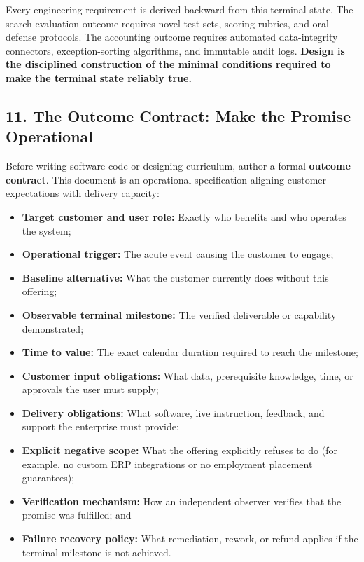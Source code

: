 Every engineering requirement is derived backward from this terminal state. The search evaluation outcome requires novel test sets, scoring rubrics, and oral defense protocols. The accounting outcome requires automated data-integrity connectors, exception-sorting algorithms, and immutable audit logs. \textbf{Design is the disciplined construction of the minimal conditions required to make the terminal state reliably true.}

\subsection*{11. The Outcome Contract: Make the Promise Operational}

Before writing software code or designing curriculum, author a formal \textbf{outcome contract}. This document is an operational specification aligning customer expectations with delivery capacity:

\begin{itemize}
    \item \textbf{Target customer and user role:} Exactly who benefits and who operates the system;
    \item \textbf{Operational trigger:} The acute event causing the customer to engage;
    \item \textbf{Baseline alternative:} What the customer currently does without this offering;
    \item \textbf{Observable terminal milestone:} The verified deliverable or capability demonstrated;
    \item \textbf{Time to value:} The exact calendar duration required to reach the milestone;
    \item \textbf{Customer input obligations:} What data, prerequisite knowledge, time, or approvals the user must supply;
    \item \textbf{Delivery obligations:} What software, live instruction, feedback, and support the enterprise must provide;
    \item \textbf{Explicit negative scope:} What the offering explicitly refuses to do (for example, no custom ERP integrations or no employment placement guarantees);
    \item \textbf{Verification mechanism:} How an independent observer verifies that the promise was fulfilled; and
    \item \textbf{Failure recovery policy:} What remediation, rework, or refund applies if the terminal milestone is not achieved.
\end{itemize}

